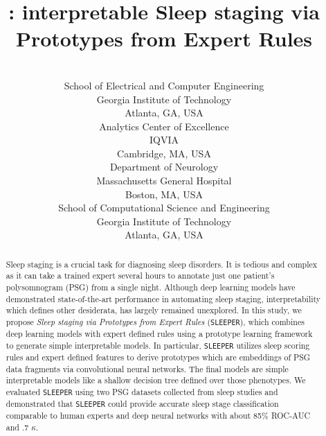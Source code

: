 \documentclass[pmlr]{jmlr}
\title[\mname]{\mname: interpretable Sleep staging via Prototypes from Expert Rules}
\author{\Name{Irfan Al-Hussaini} \Email{alhussaini.irfan@gatech.edu} \\
      \addr School of Electrical and Computer Engineering\\
      Georgia Institute of Technology\\
      Atlanta, GA, USA
      \AND
      \Name{Cao Xiao} \Email{cao.xiao@iqvia.com} \\
      \addr Analytics Center of Excellence\\
      IQVIA\\
      Cambridge, MA, USA
      \AND
      \Name{M. Brandon Westover} \Email{mwestover@mgh.harvard.edu} \\
      \addr Department of Neurology\\
      Massachusetts General Hospital\\
      Boston, MA, USA 
      \AND
      \Name{Jimeng Sun} \Email{jsun@cc.gatech.edu} \\
      \addr School of Computational Science and Engineering\\
      Georgia Institute of Technology\\
      Atlanta, GA, USA}
\newcommand{\mname}
{\texttt{SLEEPER}\xspace}
\begin{document}
\maketitle

\begin{abstract}
Sleep staging is a crucial task for diagnosing sleep disorders. It is tedious and complex as it can take a trained expert several hours to  annotate just one patient's polysomnogram (PSG) from a single night. Although deep learning models have demonstrated state-of-the-art performance in automating sleep staging, interpretability which defines other desiderata, has largely remained unexplored. In this study, 
we propose {\it Sleep staging via Prototypes from Expert Rules} (\mname), which combines deep learning models with expert defined rules using a prototype learning framework to generate simple interpretable models.
In particular, \mname utilizes sleep scoring rules and expert defined features to derive prototypes which are embeddings of PSG data fragments via convolutional neural networks. The final models are simple interpretable models like a shallow decision tree defined over those phenotypes. We evaluated \mname using two PSG datasets collected from sleep studies and demonstrated that \mname could provide accurate sleep stage classification comparable to human experts and deep neural networks with about 85\% ROC-AUC and .7 $\kappa$. 





\end{abstract}
\end{document}
